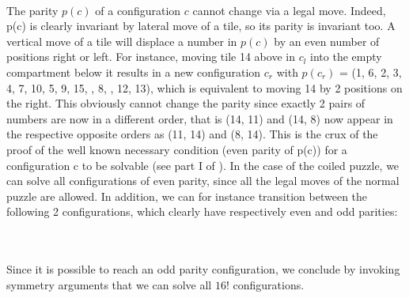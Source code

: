 \begin{fifteen}
\end{fifteen}
% 
\begin{fifteen}
\end{fifteen}
\\
The parity $p(c)$ of a configuration $c$ cannot change via a legal move. Indeed, p(c) is clearly invariant by lateral move of a tile, so its parity is invariant too. A vertical move of a tile will displace a number in $p(c)$ by an even number of positions right or left. For instance, moving tile 14 above in $c_{l}$  into the empty compartment below it results in a new configuration $c_{r}$ with $p(c_{r})$ = (1, 6, 2, 3, 4, 7, 10, 5, 9, 15, , 8\black, \black, 12, 13), which is equivalent to moving 14 by 2 positions on the right. This obviously cannot change the parity since exactly 2 pairs of numbers are now in a different order, that is (14, 11) and (14, 8) now appear in the respective opposite orders as (11, 14) and (8, 14). This is the crux of the proof of the well known necessary condition (even parity of p(c)) for a configuration c to be solvable (see part I of \cite{Johnson1879}). In the case of the coiled puzzle, we can solve all configurations of even parity, since all the legal moves of the normal puzzle are allowed. In addition, we can for instance transition between the following 2 configurations, which clearly have respectively even and odd parities:

\begin{fifteen}
\centering
{}
\end{fifteen}
%
\begin{fifteen}
\end{fifteen}
\\
\\
Since it is possible to reach an odd parity configuration, we conclude by invoking symmetry arguments that we can solve all $16!$ configurations. 


\label{Theory:SPSSS}

